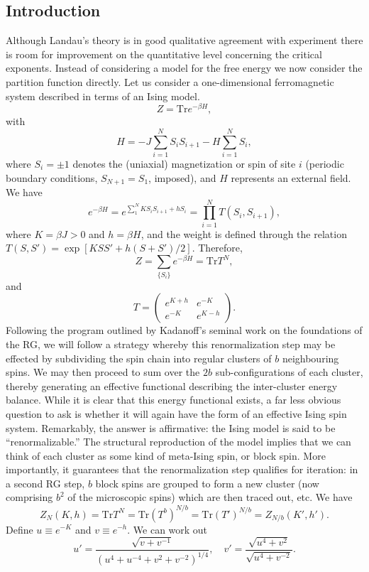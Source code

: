 \subsection{Introduction}
Although Landau's theory is in good qualitative agreement with experiment there is room for improvement on the quantitative level concerning the critical exponents.
Instead of considering a model for the free energy we now consider the partition function directly.
Let us consider a one-dimensional ferromagnetic system described in terms of an Ising model.
\[Z = \mathrm{Tr}e^{-\beta H},\]
with
\[H = -J\sum_{i=1}^N S_i S_{i+1} - H\sum_{i=1}^N S_i,\]
where $S_i = \pm 1$ denotes the (uniaxial) magnetization or spin of site $i$ (periodic boundary conditions, $S_{N+1} = S_1$, imposed), and $H$ represents an external field. We have
\[e^{-\beta H} = e^{\sum_{1}^N KS_iS_{i+1} + hS_i} = \prod_{i=1}^N T(S_i,S_{i+1}),\]
where $K = \beta J > 0$ and $h = \beta H$, and the weight is defined through the relation $T(S,S') = \exp[KSS' + h(S+S')/2]$. Therefore,
\[Z = \sum_{\{S_i\}} e^{-\beta H} = \mathrm{Tr}T^N,\]
and
\[T = \begin{pmatrix}
e^{K+h} & e^{-K} \\ e^{-K} & e^{K-h}
\end{pmatrix}.\]
Following the program outlined by Kadanoff's seminal work on the foundations of the RG, we will follow a strategy whereby this renormalization step may be effected by subdividing the spin chain into regular clusters of $b$ neighbouring spins. We may then proceed to sum over the $2b$ sub-configurations of each cluster, thereby generating an effective functional describing the inter-cluster energy balance. 
While it is clear that this energy functional exists, a far less obvious question to ask is whether it will again have the form of an effective Ising spin system. Remarkably, the answer is affirmative: the Ising model is said to be ``renormalizable.'' 
The structural reproduction of the model implies that we can think of each cluster as some kind of meta-Ising spin, or block spin. More importantly, it guarantees that the renormalization step qualifies for iteration: in a second RG step, $b$ block spins are grouped to form a new cluster (now comprising $b^2$ of the microscopic spins) which are then traced out, etc. We have
\[Z_{N}(K,h) = \mathrm{Tr} T^N = \mathrm{Tr} (T^b)^{N/b} =\mathrm{Tr} (T')^{N/b} = Z_{N/b}(K',h').\]
Define $u \equiv e^{-K}$ and $v \equiv e^{-h}$. We can work out
\[u' = \frac{\sqrt{v+v^{-1}}}{(u^4 + u^{-4} + v^2 + v^{-2})^{1/4}} , \quad v' = \frac{\sqrt{u^4 + v^2}}{\sqrt{u^4 + v^{-2}}}.\]

